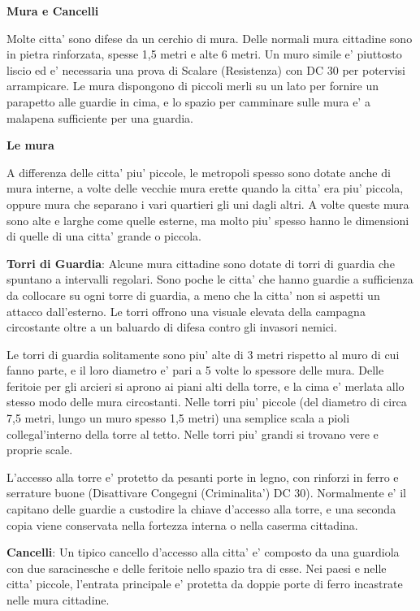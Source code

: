 \documentclass[a4paper,11pt,twoside,openany]{book}
\begin{document}
{		\textbf{Mura e Cancelli}
		
		Molte citta' sono difese da un cerchio di mura. Delle normali mura cittadine sono in pietra rinforzata, spesse 1,5 metri e alte 6 metri. Un muro simile e' piuttosto liscio ed e' necessaria una prova di Scalare (Resistenza) con DC 30 per potervisi arrampicare. Le mura dispongono di piccoli merli su un lato per fornire un parapetto alle guardie in cima, e lo spazio per camminare sulle mura e' a malapena sufficiente per una guardia.
		
		\textbf{Le mura}
		
		A differenza delle citta' piu' piccole, le metropoli spesso sono dotate anche di mura interne, a volte delle vecchie mura erette quando la citta' era piu' piccola, oppure mura che separano i vari quartieri gli uni dagli altri. A volte queste mura sono alte e larghe come quelle esterne, ma molto piu' spesso hanno le dimensioni di quelle di una citta' grande o piccola.
		
		\textbf{Torri di Guardia}: Alcune mura cittadine sono dotate di torri di guardia che spuntano a intervalli regolari. Sono poche le citta' che hanno guardie a sufficienza da collocare su ogni torre di guardia, a meno che la citta' non si aspetti un attacco dall'esterno. Le torri offrono una visuale elevata della campagna circostante oltre a un baluardo di difesa contro gli invasori nemici.
		
		Le torri di guardia solitamente sono piu' alte di 3 metri rispetto al muro di cui fanno parte, e il loro diametro e' pari a 5 volte lo spessore delle mura. Delle feritoie per gli arcieri si aprono ai piani alti della torre, e la cima e' merlata allo stesso modo delle mura circostanti. Nelle torri piu' piccole (del diametro di circa 7,5 metri, lungo un muro spesso 1,5 metri) una semplice scala a pioli collegal'interno della torre al tetto. Nelle torri piu' grandi si trovano vere e proprie scale.
		
		L'accesso alla torre e' protetto da pesanti porte in legno, con rinforzi in ferro e serrature buone (Disattivare Congegni (Criminalita') DC 30). Normalmente e' il capitano delle guardie a custodire la chiave d'accesso alla torre, e una seconda copia viene conservata nella fortezza interna o nella caserma cittadina.
		
		\textbf{Cancelli}: Un tipico cancello d'accesso alla citta' e' composto da una guardiola con due saracinesche e delle feritoie nello spazio tra di esse. Nei paesi e nelle citta' piccole, l'entrata principale e' protetta da doppie porte di ferro incastrate nelle mura cittadine.
		
}
\end{document}
